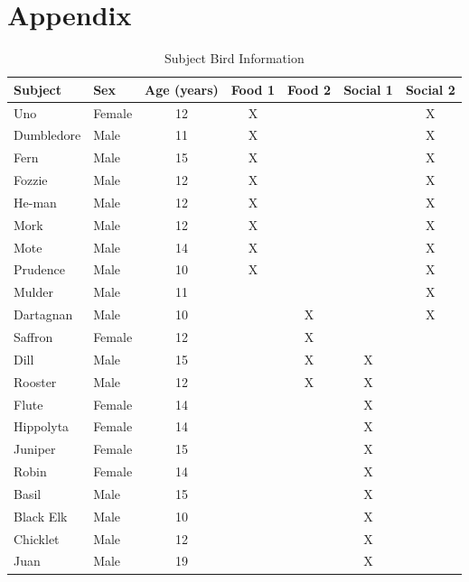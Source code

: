 \documentclass[
  ,pub,floatsintext]{apa6}
\begin{document}
\newpage
\clearpage

\hypertarget{appendix}{%
\section{Appendix}\label{appendix}}

\singlespacing
\renewcommand{\thetable}{A\arabic{table}}
\setcounter{table}{0}
\renewcommand{\thefigure}{A\arabic{figure}}
\setcounter{figure}{0}

\begin{table}[!h]

\caption{\label{tab:subjectinfotablelatex}Subject Bird Information}
\centering
\begin{tabular}[t]{llccccc}
\toprule
Subject & Sex & Age (years) & Food 1 & Food 2 & Social 1 & Social 2\\
\midrule
Uno & Female & 12 & X &  &  & X\\
Dumbledore & Male & 11 & X &  &  & X\\
Fern & Male & 15 & X &  &  & X\\
Fozzie & Male & 12 & X &  &  & X\\
He-man & Male & 12 & X &  &  & X\\
Mork & Male & 12 & X &  &  & X\\
Mote & Male & 14 & X &  &  & X\\
Prudence & Male & 10 & X &  &  & X\\
Mulder & Male & 11 &  &  &  & X\\
Dartagnan & Male & 10 &  & X &  & X\\
Saffron & Female & 12 &  & X &  & \\
Dill & Male & 15 &  & X & X & \\
Rooster & Male & 12 &  & X & X & \\
Flute & Female & 14 &  &  & X & \\
Hippolyta & Female & 14 &  &  & X & \\
Juniper & Female & 15 &  &  & X & \\
Robin & Female & 14 &  &  & X & \\
Basil & Male & 15 &  &  & X & \\
Black Elk & Male & 10 &  &  & X & \\
Chicklet & Male & 12 &  &  & X & \\
Juan & Male & 19 &  &  & X & \\
\bottomrule
\end{tabular}
\end{table}
\end{document}
